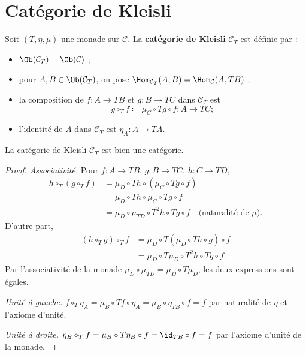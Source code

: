 \section{Catégorie de Kleisli}\label{sec:kleisli}

\begin{definition}\label{def:categorie-kleisli}
Soit $(T, \eta, \mu)$ une monade sur $\mathcal{C}$.
La \textbf{catégorie de Kleisli} $\mathcal{C}_T$ est définie par :
\begin{itemize}
    \item $\Ob(\mathcal{C}_T) = \Ob(\mathcal{C})$ ;
    \item pour $A, B \in \Ob(\mathcal{C}_T)$, on pose
    $\Hom_{\mathcal{C}_T}(A, B) = \Hom_{\mathcal{C}}(A, TB)$ ;
    \item la composition de $f \colon A \to TB$ et $g \colon B \to TC$
    dans $\mathcal{C}_T$ est
    \[
        g \circ_T f \coloneqq \mu_C \circ Tg \circ f \colon A \to TC ;
    \]
    \item l'identité de $A$ dans $\mathcal{C}_T$ est $\eta_A \colon A \to TA$.
\end{itemize}
\end{definition}

\begin{proposition}\label{prop:kleisli-categorie}
La catégorie de Kleisli $\mathcal{C}_T$ est bien une catégorie.
\end{proposition}

\begin{proof}
\emph{Associativité.}
Pour $f \colon A \to TB$, $g \colon B \to TC$, $h \colon C \to TD$,
\begin{align*}
    h \circ_T (g \circ_T f)
    &= \mu_D \circ Th \circ (\mu_C \circ Tg \circ f) \\
    &= \mu_D \circ Th \circ \mu_C \circ Tg \circ f \\
    &= \mu_D \circ \mu_{TD} \circ T^2 h \circ Tg \circ f
    \quad \text{(naturalité de $\mu$)}.
\end{align*}
D'autre part,
\begin{align*}
    (h \circ_T g) \circ_T f
    &= \mu_D \circ T(\mu_D \circ Th \circ g) \circ f \\
    &= \mu_D \circ T\mu_D \circ T^2 h \circ Tg \circ f.
\end{align*}
Par l'associativité de la monade $\mu_D \circ \mu_{TD} = \mu_D \circ T\mu_D$,
les deux expressions sont égales.

\emph{Unité à gauche.}
$f \circ_T \eta_A = \mu_B \circ Tf \circ \eta_A
= \mu_B \circ \eta_{TB} \circ f = f$
par naturalité de $\eta$ et l'axiome d'unité.

\emph{Unité à droite.}
$\eta_B \circ_T f = \mu_B \circ T\eta_B \circ f = \id_{TB} \circ f = f$
par l'axiome d'unité de la monade.
\end{proof}

